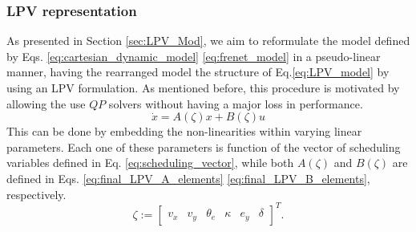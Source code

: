 \documentclass[a4paper,fleqn]{cas-sc}
\begin{document}
\subsubsection{LPV representation}    
\label{sec:LPV}

As presented in Section \ref{sec:LPV_Mod}, we aim to reformulate the model defined by Eqs. \eqref{eq:cartesian_dynamic_model} \eqref{eq:frenet_model}
 in a pseudo-linear manner, having the rearranged model the structure of Eq.\eqref{eq:LPV_model} by using an LPV formulation. As mentioned before, this procedure is motivated by allowing the use $QP$ solvers without having a major loss in performance. 
\begin{equation}
    \label{eq:LPV_model}
    \dot x = A(\zeta) x + B(\zeta) u                 
\end{equation}
This can be done by embedding the non-linearities within varying linear parameters. Each one of these parameters is function of the vector of scheduling variables defined in Eq. \eqref{eq:scheduling_vector}, while both $ A(\zeta)$ and $B(\zeta)$ are defined in Eqs. \eqref{eq:final_LPV_A_elements} \eqref{eq:final_LPV_B_elements}, respectively. 
\begin{equation}
\label{eq:scheduling_vector}
    \zeta := \left[\begin{array}{cccccc} v_x & v_y & \theta_e & \kappa & e_y & \delta \end{array}\right]^T .
\end{equation}
\end{document}
